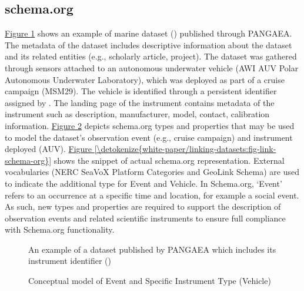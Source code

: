 \documentclass[a4paper,10pt,english]{sphinxmanual}
\begin{document}
\subsection{schema.org}
\label{\detokenize{white-paper/linking-datasets:schema-org}}
\sphinxAtStartPar
\hyperref[\detokenize{white-paper/linking-datasets:fig-link-pangea}]{Figure \ref{\detokenize{white-paper/linking-datasets:fig-link-pangea}}} shows an example of marine dataset
() published through PANGAEA. The
metadata of the dataset includes descriptive information about the
dataset and its related entities (e.g., scholarly article, project). The
dataset was gathered through sensors attached to an autonomous
underwater vehicle (AWI AUV Polar Autonomous Underwater Laboratory),
which was deployed as part of a cruise campaign (MSM29). The vehicle is
identified through a persistent identifier assigned by
. The landing page of the instrument contains
metadata of the instrument such as description, manufacturer, model,
contact, calibration information. \hyperref[\detokenize{white-paper/linking-datasets:fig-link-model}]{Figure \ref{\detokenize{white-paper/linking-datasets:fig-link-model}}} depicts
schema.org types and properties that may be used to model the
dataset’s observation event (e.g., cruise campaign) and instrument
deployed (AUV). \hyperref[\detokenize{white-paper/linking-datasets:fig-link-schema-org}]{Figure \ref{\detokenize{white-paper/linking-datasets:fig-link-schema-org}}} shows the snippet of
actual schema.org representation. External vocabularies (NERC SeaVoX
Platform Categories and GeoLink Schema) are used to indicate the
additional type for Event and Vehicle. In Schema.org, ‘Event’ refers
to an occurrence at a specific time and location, for example a social
event. As such, new types and properties are required to support the
description of observation events and related scientific instruments
to ensure full compliance with Schema.org functionality.

\begin{figure}[htbp]
\centering
\capstart

\noindent{}
\caption{An example of a dataset published by PANGAEA which includes its
instrument identifier
()}\label{\detokenize{white-paper/linking-datasets:fig-link-pangea}}\end{figure}

\begin{figure}[htbp]
\centering
\capstart

\noindent{}
\caption{Conceptual model of Event and Specific Instrument Type (Vehicle)}\label{\detokenize{white-paper/linking-datasets:fig-link-model}}\end{figure}
\end{document}
